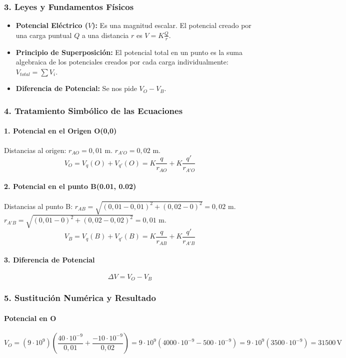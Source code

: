 \subsubsection*{3. Leyes y Fundamentos Físicos}
\begin{itemize}
    \item \textbf{Potencial Eléctrico ($V$):} Es una magnitud escalar. El potencial creado por una carga puntual $Q$ a una distancia $r$ es $V = K \frac{Q}{r}$.
    \item \textbf{Principio de Superposición:} El potencial total en un punto es la suma algebraica de los potenciales creados por cada carga individualmente: $V_{total} = \sum V_i$.
    \item \textbf{Diferencia de Potencial:} Se nos pide $V_O - V_B$.
\end{itemize}

\subsubsection*{4. Tratamiento Simbólico de las Ecuaciones}
\paragraph{1. Potencial en el Origen O(0,0)}
Distancias al origen:
$r_{AO} = 0,01$ m.
$r_{A'O} = 0,02$ m.
$$V_O = V_q(O) + V_{q'}(O) = K\frac{q}{r_{AO}} + K\frac{q'}{r_{A'O}}$$
\paragraph{2. Potencial en el punto B(0.01, 0.02)}
Distancias al punto B:
$r_{AB} = \sqrt{(0,01-0,01)^2 + (0,02-0)^2} = 0,02$ m.
$r_{A'B} = \sqrt{(0,01-0)^2 + (0,02-0,02)^2} = 0,01$ m.
$$V_B = V_q(B) + V_{q'}(B) = K\frac{q}{r_{AB}} + K\frac{q'}{r_{A'B}}$$
\paragraph{3. Diferencia de Potencial}
$$\Delta V = V_O - V_B$$

\subsubsection*{5. Sustitución Numérica y Resultado}
\paragraph{Potencial en O}
$$V_O = (9\cdot10^9) \left( \frac{40\cdot10^{-9}}{0,01} + \frac{-10\cdot10^{-9}}{0,02} \right) = 9\cdot10^9 (4000\cdot10^{-9} - 500\cdot10^{-9}) = 9\cdot10^9 (3500\cdot10^{-9}) = 31500 \, \text{V}$$
